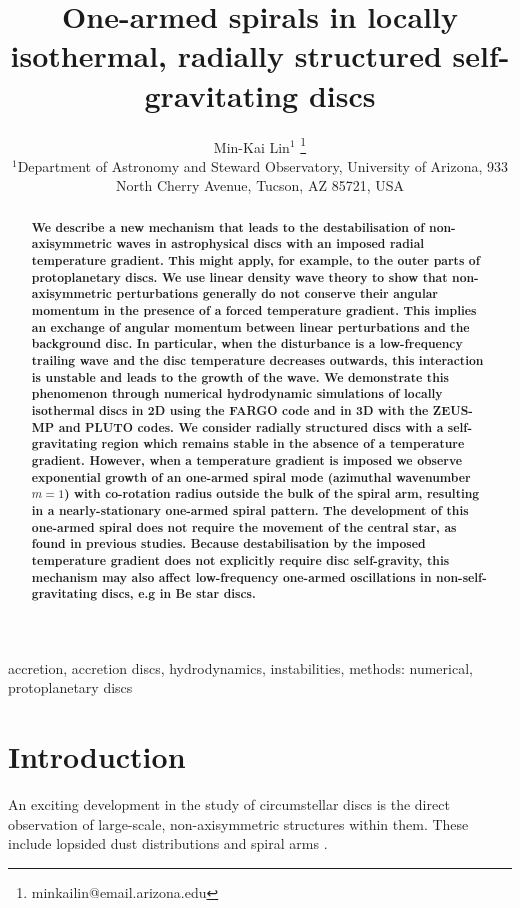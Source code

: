 \documentclass[useAMS,usenatbib]{mn2e}
\title[One-armed spirals]{One-armed spirals in 
  locally isothermal, radially structured self-gravitating discs}
\author[Lin]{Min-Kai Lin$^{1}$
  \thanks{ minkailin@email.arizona.edu} \\ 
  $^1$Department of Astronomy and Steward Observatory, University of
  Arizona, 933 North Cherry Avenue, Tucson, AZ 85721, USA 
}
\begin{document}
\maketitle
\begin{abstract} 
  {\bf We describe a new mechanism that leads to the destabilisation of
 non-axisymmetric waves in astrophysical discs with 
 an imposed radial temperature gradient. This might apply, for
 example, to the outer parts of protoplanetary discs. We use linear
 density wave theory 
 to show that non-axisymmetric perturbations generally do not conserve
 their angular momentum in the presence of a forced temperature
 gradient. This implies an exchange of angular momentum
 between linear perturbations and the background disc. In particular, 
 when the disturbance is a low-frequency
 trailing wave and the disc temperature decreases outwards, this 
 interaction is unstable and leads to the growth of the wave.  
 We demonstrate this phenomenon through numerical hydrodynamic
 simulations of locally isothermal discs in 2D using the FARGO
 code and in 3D with  the ZEUS-MP and PLUTO codes.  We consider
 radially structured discs with a self-gravitating region which remains
 stable in the absence of a temperature gradient. However,
 when a temperature gradient is imposed we observe exponential growth of an one-armed  
 spiral mode (azimuthal wavenumber $m=1$) with co-rotation radius 
 outside the bulk of the spiral arm, resulting in a nearly-stationary
 one-armed spiral pattern.  The development of this one-armed 
 spiral does not require the movement of the central star, as found in previous studies. 
 Because destabilisation by the imposed temperature gradient does 
 not explicitly require disc self-gravity, this mechanism may also
 affect low-frequency one-armed oscillations in non-self-gravitating
 discs, e.g in Be star discs. 
}
\end{abstract}



\begin{keywords}
  accretion, accretion discs, hydrodynamics, instabilities, methods: numerical, protoplanetary discs 
\end{keywords}

\section{Introduction}\label{intro}
An exciting development in the study of circumstellar 
discs is the direct observation of large-scale, non-axisymmetric
structures within them. These
include lopsided dust distributions 
\citep{marel13,fukagawa13,casassus13,isella13,perez14,follette14} and
spiral arms 
\citep{hashimoto11,muto12,boccaletti14,grady13,christiaens14,avenhaus14}. 
\end{document}
